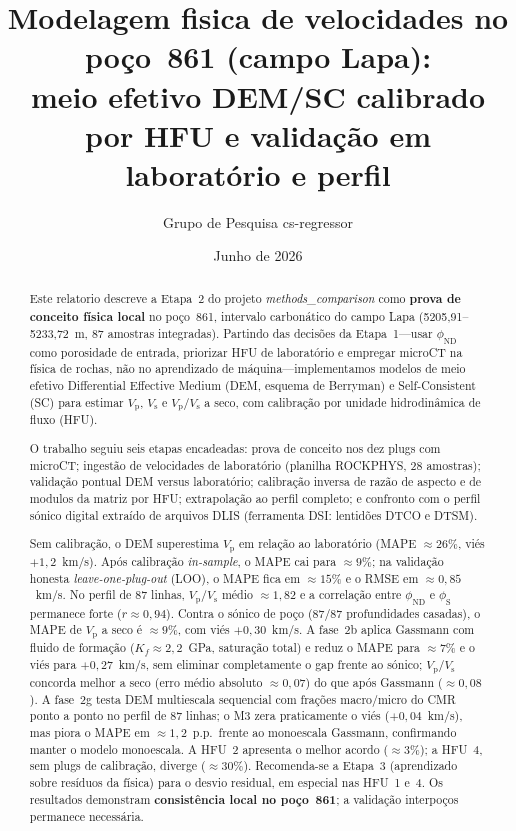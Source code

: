 \documentclass[11pt,a4paper]{article}
\title{%
  Modelagem fisica de velocidades no poço~861 (campo Lapa):\\
  meio efetivo DEM/SC calibrado por HFU e validação em laboratório e perfil
}
\author{Grupo de Pesquisa cs-regressor}
\date{Junho de 2026}
\numberwithin{equation}{section}
\newcommand{\phiND}{\ensuremath{\phi_{\mathrm{ND}}}}
\newcommand{\phiS}{\ensuremath{\phi_{\mathrm{S}}}}
\newcommand{\Vp}{\ensuremath{V_{\mathrm{p}}}}
\newcommand{\Vs}{\ensuremath{V_{\mathrm{s}}}}
\newcommand{\VpVs}{\ensuremath{V_{\mathrm{p}}/V_{\mathrm{s}}}}
\begin{document}
\maketitle

\begin{abstract}
Este relatorio descreve a Etapa~2 do projeto \emph{methods\_comparison} como
\textbf{prova de conceito física local} no poço~861, intervalo
carbonático do campo Lapa (5205,91--5233,72~m, 87 amostras integradas).
Partindo das decisões da Etapa~1---usar \phiND{} como porosidade de entrada,
priorizar HFU de laboratório e empregar microCT na física de rochas, não
no aprendizado de máquina---implementamos modelos de meio efetivo
Differential Effective Medium (DEM, esquema de Berryman) e Self-Consistent
(SC) para estimar \Vp{}, \Vs{} e \VpVs{} a seco, com calibração por
unidade hidrodinâmica de fluxo (HFU).

O trabalho seguiu seis etapas encadeadas: prova de conceito nos dez plugs com
microCT; ingestão de velocidades de laboratório (planilha ROCKPHYS, 28
amostras); validação pontual DEM versus laboratório; calibração
inversa de razão de aspecto e de modulos da matriz por HFU; extrapolação
ao perfil completo; e confronto com o perfil sónico digital extraído de
arquivos DLIS (ferramenta DSI: lentidões DTCO e DTSM).

Sem calibração, o DEM superestima \Vp{} em relação ao laboratório
(MAPE $\approx 26\%$, viés $+1{,}2$~km/s).
Após calibração \emph{in-sample}, o MAPE cai para $\approx 9\%$; na
validação honesta \emph{leave-one-plug-out} (LOO), o MAPE fica em
$\approx 15\%$ e o RMSE em $\approx 0{,}85$~km/s.
No perfil de 87 linhas, \VpVs{} médio $\approx 1{,}82$ e a correlação
entre \phiND{} e \phiS{} permanece forte ($r \approx 0{,}94$).
Contra o sónico de poço (87/87 profundidades casadas), o MAPE de \Vp{}
a seco é $\approx 9\%$, com viés $+0{,}30$~km/s.
A fase~2b aplica Gassmann com fluido de formação ($K_f \approx 2{,}2$~GPa,
saturação total) e reduz o MAPE para $\approx 7\%$ e o viés para
$+0{,}27$~km/s, sem eliminar completamente o gap frente ao sónico;
\VpVs{} concorda melhor a seco (erro médio absoluto $\approx 0{,}07$) do que
após Gassmann ($\approx 0{,}08$).
A fase~2g testa DEM multiescala sequencial com frações macro/micro do CMR
ponto a ponto no perfil de 87 linhas; o M3 zera praticamente o viés
($+0{,}04$~km/s), mas piora o MAPE em $\approx 1{,}2$~p.p.\ frente ao
monoescala Gassmann, confirmando manter o modelo monoescala.
A HFU~2 apresenta o melhor acordo ($\approx 3\%$); a HFU~4, sem plugs de
calibração, diverge ($\approx 30\%$).
Recomenda-se a Etapa~3 (aprendizado sobre resíduos da física) para o
desvio residual, em especial nas HFU~1 e~4.
Os resultados demonstram \textbf{consistência local no poço~861}; a
validação interpoços permanece necessária.
\end{abstract}
\end{document}
